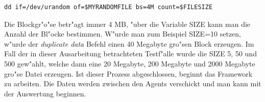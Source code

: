 \begin{verbatim}
dd if=/dev/urandom of=$MYRANDOMFILE bs=4M count=$FILESIZE 
\end{verbatim}
Die Blockgr"o"se betr"agt immer 4 MB, "uber die Variable SIZE kann man die Anzahl der Bl"ocke %
bestimmen. W"urde man zum Beispiel SIZE=10 setzen, w"urde der \emph{duplicate data} Befehl einen 40 Megabyte gro"sen Block erzeugen. %
Im Fall der in dieser Ausarbeitung betrachteten Testf"alle wurde die SIZE 5, 50 und 500 gew"ahlt, welche %
dann eine 20 Megabyte, 200 Megabyte und 2000 Megabyte gro"se Datei erzeugen. %
Ist dieser Prozess abgeschlossen, beginnt das Framework zu arbeiten. Die Daten %
werden zwischen den Agents verschickt und man kann mit der Auswertung beginnen. %


